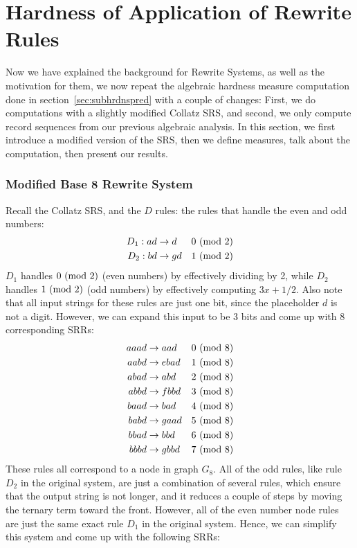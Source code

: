 \chapter{Hardness of Application of Rewrite Rules} \label{sec:hardnessrewriterules}
Now we have explained the background for Rewrite Systems, as well as the motivation for them, we now repeat the algebraic hardness measure computation done in section~\ref{sec:subhrdnspred} with a couple of changes: First, we do computations with a slightly modified Collatz SRS, and second, we only compute record sequences from our previous algebraic analysis. In this section, we first introduce a modified version of the SRS, then we define measures, talk about the computation, then present our results.

\subsection{Modified Base 8 Rewrite System} \label{subsec:base8rewrite}
Recall the Collatz SRS, and the $D$ rules: the rules that handle the even and odd numbers:
\begin{align*}
    D_1: ad &\rightarrow d &\text{$0\ (\mathrm{mod}\ 2)$}\\
    D_2: bd &\rightarrow gd &\text{$1\ (\mathrm{mod}\ 2)$}\\
\end{align*}
$D_1$ handles $0 \ (\mathrm{mod}\ 2)$ (even numbers) by effectively dividing by 2, while $D_2$ handles $1 \ (\mathrm{mod}\ 2)$ (odd numbers)  by effectively computing $3x+1/2$. Also note that all input strings for these rules are just one bit, since the placeholder $d$ is not a digit. However, we can expand this input to be 3 bits and come up with 8 corresponding SRRs:
\begin{align*}
    aaad &\rightarrow aad &\text{$0\ (\mathrm{mod}\ 8)$}\\
    aabd &\rightarrow ebad &\text{$1\ (\mathrm{mod}\ 8)$}\\
    abad &\rightarrow abd &\text{$2\ (\mathrm{mod}\ 8)$}\\
    abbd &\rightarrow fbbd &\text{$3\ (\mathrm{mod}\ 8)$}\\
    baad &\rightarrow bad &\text{$4\ (\mathrm{mod}\ 8)$}\\
    babd &\rightarrow gaad &\text{$5\ (\mathrm{mod}\ 8)$}\\
    bbad &\rightarrow bbd &\text{$6\ (\mathrm{mod}\ 8)$}\\
    bbbd &\rightarrow gbbd &\text{$7\ (\mathrm{mod}\ 8)$}
\end{align*}
These rules all correspond to a node in graph $G_8$. All of the odd rules, like rule $D_2$ in the original system, are just a combination of several rules, which ensure that the output string is not longer, and it reduces a couple of steps by moving the ternary term toward the front. However, all of the even number node rules are just the same exact rule $D_1$ in the original system. Hence, we can simplify this system and come up with the following SRRs:
